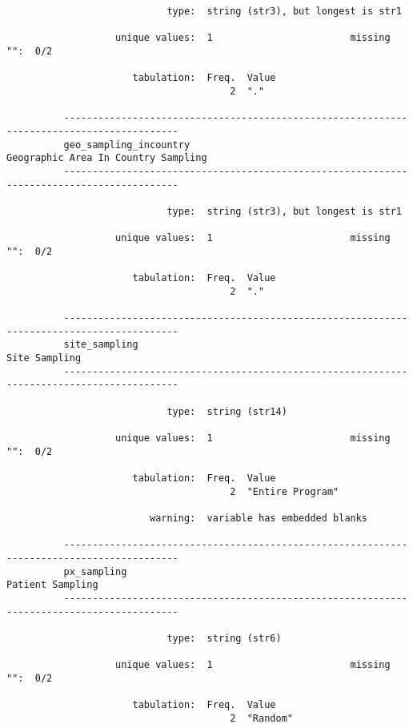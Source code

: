 \documentclass{article}
\begin{document}
\begin{verbatim}
                            type:  string (str3), but longest is str1
          
                   unique values:  1                        missing "":  0/2
          
                      tabulation:  Freq.  Value
                                       2  "."
          
          ------------------------------------------------------------------------------------------
          geo_sampling_incountry                                 Geographic Area In Country Sampling
          ------------------------------------------------------------------------------------------
          
                            type:  string (str3), but longest is str1
          
                   unique values:  1                        missing "":  0/2
          
                      tabulation:  Freq.  Value
                                       2  "."
          
          ------------------------------------------------------------------------------------------
          site_sampling                                                                Site Sampling
          ------------------------------------------------------------------------------------------
          
                            type:  string (str14)
          
                   unique values:  1                        missing "":  0/2
          
                      tabulation:  Freq.  Value
                                       2  "Entire Program"
          
                         warning:  variable has embedded blanks
          
          ------------------------------------------------------------------------------------------
          px_sampling                                                               Patient Sampling
          ------------------------------------------------------------------------------------------
          
                            type:  string (str6)
          
                   unique values:  1                        missing "":  0/2
          
                      tabulation:  Freq.  Value
                                       2  "Random"
          

\end{verbatim}
\end{document}
